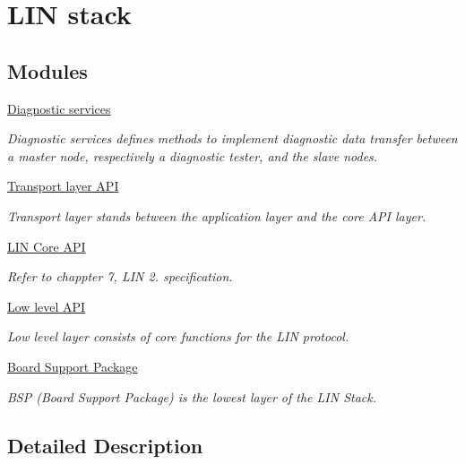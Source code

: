 \hypertarget{group___l_i_n___stack}{}\section{L\+I\+N stack}
\label{group___l_i_n___stack}
\subsection*{Modules}
\begin{DoxyCompactItemize}
\item 
\hyperlink{group__diagnostic__group}{Diagnostic services}
\begin{DoxyCompactList}\small\item\em Diagnostic services defines methods to implement diagnostic data transfer between a master node, respectively a diagnostic tester, and the slave nodes. \end{DoxyCompactList}\item 
\hyperlink{group__transport__group}{Transport layer A\+P\+I}
\begin{DoxyCompactList}\small\item\em Transport layer stands between the application layer and the core A\+P\+I layer. \end{DoxyCompactList}\item 
\hyperlink{group__coreapi__group}{L\+I\+N Core A\+P\+I}
\begin{DoxyCompactList}\small\item\em Refer to chappter 7, L\+I\+N 2. specification. \end{DoxyCompactList}\item 
\hyperlink{group__lowlevel__group}{Low level A\+P\+I}
\begin{DoxyCompactList}\small\item\em Low level layer consists of core functions for the L\+I\+N protocol. \end{DoxyCompactList}\item 
\hyperlink{group__bsp__group}{Board Support Package}
\begin{DoxyCompactList}\small\item\em B\+S\+P (Board Support Package) is the lowest layer of the L\+I\+N Stack. \end{DoxyCompactList}\end{DoxyCompactItemize}


\subsection{Detailed Description}
